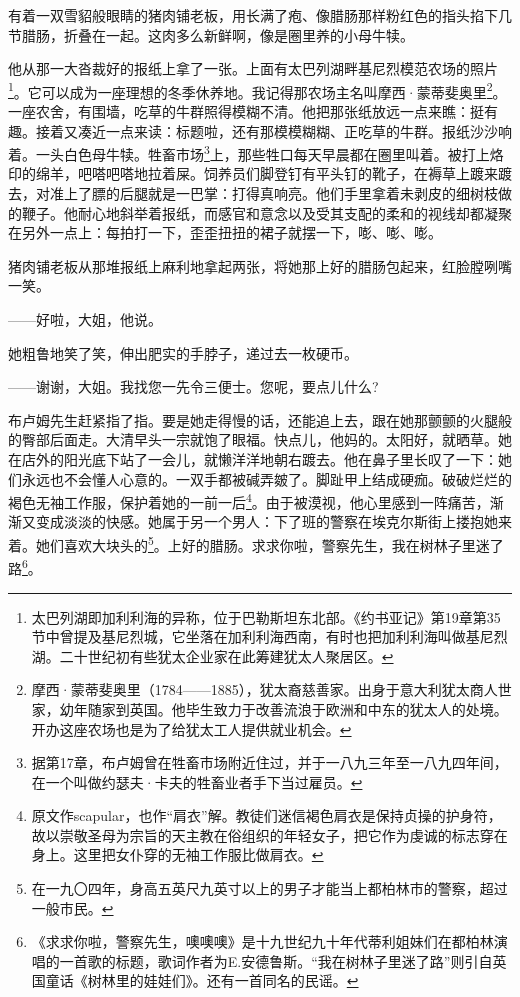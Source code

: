 \par 有着一双雪貂般眼睛的猪肉铺老板，用长满了疱、像腊肠那样粉红色的指头掐下几节腊肠，折叠在一起。这肉多么新鲜啊，像是圈里养的小母牛犊。
\par 他从那一大沓裁好的报纸上拿了一张。上面有太巴列湖畔基尼烈模范农场的照片\footnote{太巴列湖即加利利海的异称，位于巴勒斯坦东北部。《约书亚记》第19章第35节中曾提及基尼烈城，它坐落在加利利海西南，有时也把加利利海叫做基尼烈湖。二十世纪初有些犹太企业家在此筹建犹太人聚居区。}。它可以成为一座理想的冬季休养地。我记得那农场主名叫摩西·蒙蒂斐奥里\footnote{摩西·蒙蒂斐奥里（1784——1885），犹太裔慈善家。出身于意大利犹太商人世家，幼年随家到英国。他毕生致力于改善流浪于欧洲和中东的犹太人的处境。开办这座农场也是为了给犹太工人提供就业机会。}。一座农舍，有围墙，吃草的牛群照得模糊不清。他把那张纸放远一点来瞧：挺有趣。接着又凑近一点来读：标题啦，还有那模模糊糊、正吃草的牛群。报纸沙沙响着。一头白色母牛犊。牲畜市场\footnote{据第17章，布卢姆曾在牲畜市场附近住过，并于一八九三年至一八九四年间，在一个叫做约瑟夫·卡夫的牲畜业者手下当过雇员。}上，那些牲口每天早晨都在圈里叫着。被打上烙印的绵羊，吧嗒吧嗒地拉着屎。饲养员们脚登钉有平头钉的靴子，在褥草上踱来踱去，对准上了膘的后腿就是一巴掌：打得真响亮。他们手里拿着未剥皮的细树枝做的鞭子。他耐心地斜举着报纸，而感官和意念以及受其支配的柔和的视线却都凝聚在另外一点上：每拍打一下，歪歪扭扭的裙子就摆一下，嘭、嘭、嘭。
\par 猪肉铺老板从那堆报纸上麻利地拿起两张，将她那上好的腊肠包起来，红脸膛咧嘴一笑。
\par ——好啦，大姐，他说。
\par 她粗鲁地笑了笑，伸出肥实的手脖子，递过去一枚硬币。
\par ——谢谢，大姐。我找您一先令三便士。您呢，要点儿什么?
\par 布卢姆先生赶紧指了指。要是她走得慢的话，还能追上去，跟在她那颤颤的火腿般的臀部后面走。大清早头一宗就饱了眼福。快点儿，他妈的。太阳好，就晒草。她在店外的阳光底下站了一会儿，就懒洋洋地朝右踱去。他在鼻子里长叹了一下：她们永远也不会懂人心意的。一双手都被碱弄皴了。脚趾甲上结成硬痂。破破烂烂的褐色无袖工作服，保护着她的一前一后\footnote{原文作scapular，也作“肩衣”解。教徒们迷信褐色肩衣是保持贞操的护身符，故以崇敬圣母为宗旨的天主教在俗组织的年轻女子，把它作为虔诚的标志穿在身上。这里把女仆穿的无袖工作服比做肩衣。}。由于被漠视，他心里感到一阵痛苦，渐渐又变成淡淡的快感。她属于另一个男人：下了班的警察在埃克尔斯街上搂抱她来着。她们喜欢大块头的\footnote{在一九〇四年，身高五英尺九英寸以上的男子才能当上都柏林市的警察，超过一般市民。}。上好的腊肠。求求你啦，警察先生，我在树林子里迷了路\footnote{《求求你啦，警察先生，噢噢噢》是十九世纪九十年代蒂利姐妹们在都柏林演唱的一首歌的标题，歌词作者为E.安德鲁斯。“我在树林子里迷了路”则引自英国童话《树林里的娃娃们》。还有一首同名的民谣。}。
